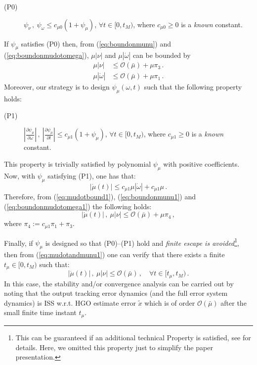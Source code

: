 \documentclass[letterpaper, 10 pt, journal, twocolumn]{IEEEtran}  %
\theoremstyle{plain}
\theoremstyle{definition}
\theoremstyle{remark}
\begin{document}
\medskip
%
\begin{description}
\item[(P0)] $\psi_\nu\,, \
\psi_\omega \leq c_{\mu 0}(1+\psi_\mu)$, $\forall t \in [0,t_M)$,
where $c_{\mu 0}\geq 0$ is a {\em known} constant.
\end{description}
%
\medskip

If  $\psi_\mu$ satisfies (P0) then, from (\ref{eq:boundonmunu})
and (\ref{eq:boundonmudotomega}), $\mu|\nu|$ and
$\mu|\dot{\omega}|$ can be bounded by
%
\begin{align}
\mu|\nu| &\leq
\mathcal{O}(\bar{\mu})+\mu\pi_3\,.\label{eq:boundonmunu1}\\
\mu|\dot{\omega}| &\leq
\mathcal{O}(\bar{\mu})+\mu\pi_1\,.\label{eq:boundonmudotomega1}
\end{align}
%
Moreover, our strategy is to design $\psi_\mu(\omega,t)$ such that the
following  property holds:

\medskip
%
\begin{description}
\item[(P1)] $\left|\frac{\partial \psi_\mu}{\partial
\omega}\right|\,, \ \left|\frac{\partial \psi_\mu}{\partial
t}\right|\leq c_{\mu 1}(1+\psi_\mu)$, $\forall t \in [0,t_M)$, where
$c_{\mu 1}\geq 0$ is a {\em known} constant.
\end{description}
%
\medskip

This property is trivially satisfied by polynomial $\psi_\mu$ with
positive coefficients. Now, with $\psi_\mu$ satisfying (P1), one has that:
%
\begin{equation}
|\dot{\mu}(t)|\!\leq\!c_{\mu 1} \mu |\dot{\omega}|+c_{\mu 1}
\mu\,. \label{eq:mudotbound1}
\end{equation}
%
Therefore, from (\ref{eq:mudotbound1}), (\ref{eq:boundonmunu1})
and (\ref{eq:boundonmudotomega1}) the following holds:
%
\begin{equation}
|\dot{\mu}(t)|\,, \ \mu|\nu| \leq \mathcal{O}(\bar{\mu}) + \mu
\pi_4\,, \label{eq:mudotandmunu1}
\end{equation}
%
where $\pi_4:=c_{\mu 1} \pi_1 +\pi_3$.

Finally, if $\psi_\mu$ is designed so that (P0)--(P1) hold and {\em finite escape is avoided}\footnote{This can be guaranteed if an additional technical Property is satisfied, see \cite{POH:2011} for details. Here, we omitted this property just to simplify the paper presentation.}, then
from (\ref{eq:mudotandmunu1})  one can verify
that there exists a finite $t_\mu \in [0,t_M)$ such that:
%
\begin{equation}
|\dot{\mu}(t)|\,, \ \mu |\nu| \leq \mathcal{O}(\bar{\mu})\,, \quad
\forall t \in [t_\mu,t_M)\,. \label{eq:mudotmunu1}
\end{equation}
%
In this case, the stability and/or convergence analysis  can be carried out by noting that the output tracking error dynamics (and the full error system dynamics) is ISS w.r.t. HGO estimate error $\tilde{x}$ which is of order $\mathcal{O}(\bar{\mu})$ after the small finite time instant $t_\mu$.
\end{document}
